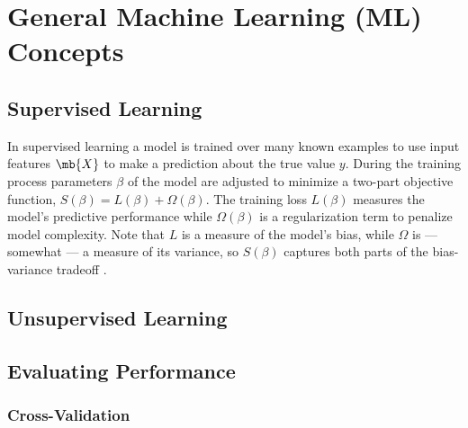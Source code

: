 \chapter{General Machine Learning (ML) Concepts}
\label{chap:ml_general}

\section{Supervised Learning}
\label{ml_general:supervised}

In supervised learning a model is trained over many known examples
to use input features $\mb{X}$ to make a prediction \yhat about the true value $y$.
During the training process parameters $\beta$ of
the model are adjusted to minimize a two-part objective function,
$S\left(\beta\right) = L\left(\beta\right) + \Omega\left(\beta\right)$.
The training loss $L\left(\beta\right)$ measures the model's predictive performance
while $\Omega\left(\beta\right)$ is a regularization term to penalize model complexity.
Note that $L$ is a measure of the model's bias,
while $\Omega$ is --- somewhat --- a measure of its variance,
so $S\left(\beta\right)$ captures both parts of the bias-variance tradeoff \cite{HastieTF09}.

\section{Unsupervised Learning}
\label{ml_general:unsupervised}

\section{Evaluating Performance}
\label{ml_general:eval}

\subsection{Cross-Validation}
\label{ml_general:eval:cv}

